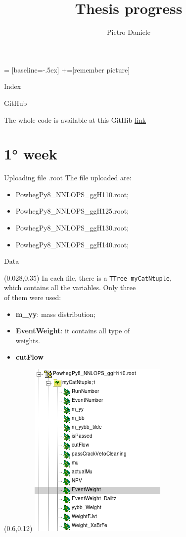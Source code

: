 \documentclass[10pt,UKenglish, leqno, xcolor = dvipsnames]{beamer}
\author{Pietro Daniele}
\title{Thesis progress}
\begin{document}
	 = [baseline=-.5ex]
	+=[remember picture]
	
	\begin{frame}{Index}
		\tableofcontents
	\end{frame}

	\begin{frame}{GitHub}
		\vfill
		\begin{center}
			The whole code is available at this GitHib \href{https://github.com/pietrodaniele/thesis}{link}
		\end{center}	
		\vfill
	\end{frame}
	
	\section{1° week}
	\SectionPage
	
		\begin{frame}{Uploading file .root}
			\vfill
			The file uploaded are:
			\begin{itemize}
				\item PowhegPy8\_NNLOPS\_ggH110.root;
				\item PowhegPy8\_NNLOPS\_ggH125.root;
				\item PowhegPy8\_NNLOPS\_ggH130.root;
				\item PowhegPy8\_NNLOPS\_ggH140.root;
			\end{itemize}
			\vfill
		\end{frame}
	
		\begin{frame}{Data}
			\vfill
			\begin{textblock}{5}(0.028,0.35)
				In each file, there is a \texttt{TTree myCatNtuple},\\ which contains all the variables. Only three\\ of them were used:
				\begin{itemize}
					\item \textbf{m\_yy}: mass distribution;
					\item \textbf{EventWeight}: it contains all type of \\weights.
					\item \textbf{cutFlow}
				\end{itemize}
			\end{textblock}
			\begin{textblock}{1}(0.6,0.12)
				\includegraphics[width=.4\textwidth]{Images/ttre.png}
			\end{textblock}
		\end{frame}
	
\end{document}
